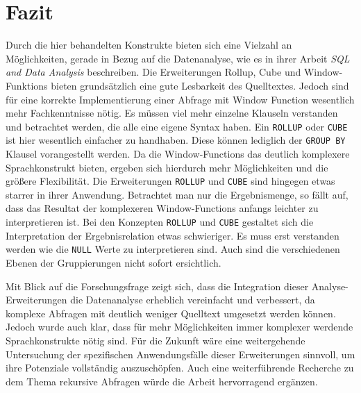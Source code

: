 \chapter{Fazit}
\label{chap:fazit} Durch die hier behandelten Konstrukte bieten sich eine Vielzahl
an Möglichkeiten, gerade in Bezug auf die Datenanalyse, wie es \citet{FOTACHE2015243}
in ihrer Arbeit \textit{SQL and Data Analysis} beschreiben. Die Erweiterungen
Rollup, Cube und Window-Funktions bieten grundsätzlich eine gute Lesbarkeit des Quelltextes.
Jedoch sind für eine korrekte Implementierung einer Abfrage mit Window Function
wesentlich mehr Fachkenntnisse nötig. Es müssen viel mehr einzelne Klauseln verstanden
und betrachtet werden, die alle eine eigene Syntax haben. Ein \texttt{ROLLUP}
oder \texttt{CUBE} ist hier wesentlich einfacher zu handhaben. Diese können
lediglich der \texttt{GROUP BY} Klausel vorangestellt werden. Da die Window-Functions
das deutlich komplexere Sprachkonstrukt bieten, ergeben sich hierdurch mehr Möglichkeiten
und die größere Flexibilität. Die Erweiterungen \texttt{ROLLUP} und \texttt{CUBE}
sind hingegen etwas starrer in ihrer Anwendung. Betrachtet man nur die Ergebnismenge,
so fällt auf, dass das Resultat der komplexeren Window-Functions anfangs leichter
zu interpretieren ist. Bei den Konzepten \texttt{ROLLUP} und \texttt{CUBE}
gestaltet sich die Interpretation der Ergebnisrelation etwas schwieriger. Es muss
erst verstanden werden wie die \texttt{NULL} Werte zu interpretieren sind. Auch sind
die verschiedenen Ebenen der Gruppierungen nicht sofort ersichtlich.

Mit Blick auf die Forschungsfrage zeigt sich, dass die Integration dieser
Analyse-Erweiterungen die Datenanalyse erheblich vereinfacht und verbessert, da komplexe
Abfragen mit deutlich weniger Quelltext umgesetzt werden können. Jedoch wurde
auch klar, dass für mehr Möglichkeiten immer komplexer werdende Sprachkonstrukte
nötig sind. Für die Zukunft wäre eine weitergehende Untersuchung der
spezifischen Anwendungsfälle dieser Erweiterungen sinnvoll, um ihre Potenziale vollständig
auszuschöpfen. Auch eine weiterführende Recherche zu dem Thema rekursive
Abfragen würde die Arbeit hervorragend ergänzen.